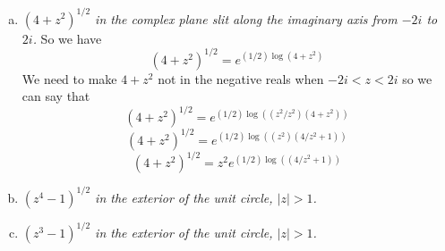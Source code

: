 \documentclass[11pt]{article}
\begin{document}
\begin{enumerate}
\begin{enumerate}[(i)]
\begin{enumerate}[(a)]
\item\textit{$(4+z^2)^{1/2}$ in the complex plane slit along the imaginary axis from $-2i$ to $2i$.}
So we have
$$(4+z^2)^{1/2} = e^{(1/2)\log(4+z^2)}$$
We need to make $4+z^2$ not in the negative reals when $-2i<z<2i$ so we can say that 
$$(4+z^2)^{1/2} = e^{(1/2)\log((z^2/z^2)(4+z^2))}$$
$$(4+z^2)^{1/2} = e^{(1/2)\log((z^2)(4/z^2+1))}$$
$$(4+z^2)^{1/2} = z^2e^{(1/2)\log((4/z^2+1))}$$
\item\textit{$(z^4-1)^{1/2}$ in the exterior of the unit circle, $|z|>1$.}
\item\textit{$(z^3-1)^{1/2}$ in the exterior of the unit circle, $|z|>1$.}
\end{enumerate}
\end{enumerate}
\end{enumerate}
\end{document}
